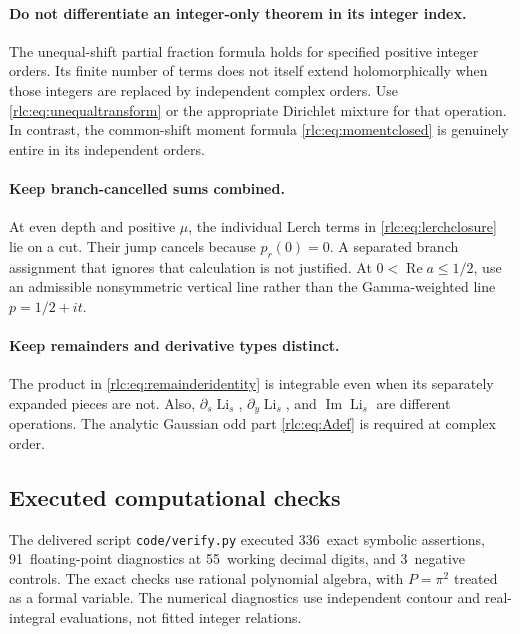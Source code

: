 \documentclass[11pt,a4paper]{article}
\numberwithin{equation}{section}
\theoremstyle{definition}\newtheorem{definition}[theorem]{Definition}
\theoremstyle{remark}\newtheorem{remark}[theorem]{Remark}
\DeclareMathOperator{\Li}{Li}
\DeclareMathOperator{\Rea}{Re}
\DeclareMathOperator{\Ima}{Im}
\newcommand{\src}[1]{\nolinkurl{#1}}
\begin{document}
\paragraph{Do not differentiate an integer-only theorem in its integer index.}
The unequal-shift partial fraction formula holds for specified positive
integer orders. Its finite number of terms does not itself extend
holomorphically when those integers are replaced by independent complex
orders. Use \eqref{rlc:eq:unequaltransform} or the appropriate Dirichlet
mixture for that operation. In contrast, the common-shift moment formula
\eqref{rlc:eq:momentclosed} is genuinely entire in its independent orders.

\paragraph{Keep branch-cancelled sums combined.}
At even depth and positive $\mu$, the individual Lerch terms in
\eqref{rlc:eq:lerchclosure} lie on a cut. Their jump cancels because
$p_r(0)=0$. A separated branch assignment that ignores that calculation
is not justified. At $0<\Rea a\le1/2$, use an admissible nonsymmetric
vertical line rather than the Gamma-weighted line $p=1/2+it$.

\paragraph{Keep remainders and derivative types distinct.}
The product in \eqref{rlc:eq:remainderidentity} is integrable even when
its separately expanded pieces are not. Also, $\partial_s\Li_s$,
$\partial_y\Li_s$, and $\Ima\Li_s$ are different operations.
The analytic Gaussian odd part \eqref{rlc:eq:Adef} is required at
complex order.

\subsection{Executed computational checks}

\newcommand{\ExactCount}{336}
\newcommand{\NumericCount}{91}
\newcommand{\NegativeCount}{3}
\newcommand{\WorkingDigits}{55}


The delivered script \src{code/verify.py} executed \ExactCount\ exact
symbolic assertions, \NumericCount\ floating-point diagnostics at
\WorkingDigits\ working decimal digits, and \NegativeCount\ negative
controls. The exact checks use rational polynomial algebra, with
$P=\pi^2$ treated as a formal variable. The numerical diagnostics use
independent contour and real-integral evaluations, not fitted integer
relations.
\end{document}
